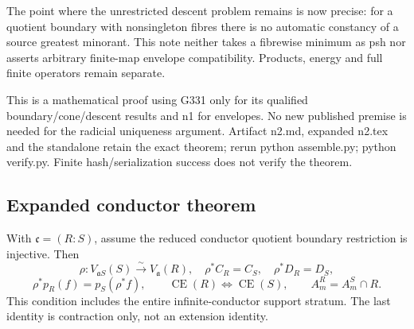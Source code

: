 The point where the unrestricted descent problem remains is now precise: for a quotient boundary with nonsingleton fibres there is no automatic constancy of a source greatest minorant. This note neither takes a fibrewise minimum as psh nor asserts arbitrary finite-map envelope compatibility. Products, energy and full finite operators remain separate.

This is a mathematical proof using G331 only for its qualified boundary/cone/descent results and n1 for envelopes. No new published premise is needed for the radicial uniqueness argument. Artifact n2.md, expanded n2.tex and the standalone retain the exact theorem; rerun python assemble.py; python verify.py. Finite hash/serialization success does not verify the theorem.

\subsection*{Expanded conductor theorem}
With $\mathfrak c=(R:S)$, assume the reduced conductor quotient boundary
restriction is injective. Then
\[
\rho:V_{\mathfrak aS}(S)\xrightarrow{\sim}V_{\mathfrak a}(R),\quad
\rho^*C_R=C_S,\quad\rho^*D_R=D_S,
\]
\[
\rho^*p_R(f)=p_S(\rho^*f),\qquad
\operatorname{CE}(R)\Longleftrightarrow\operatorname{CE}(S),\qquad
A_m^R=A_m^S\cap R.
\]
This condition includes the entire infinite-conductor support stratum.
The last identity is contraction only, not an extension identity.

